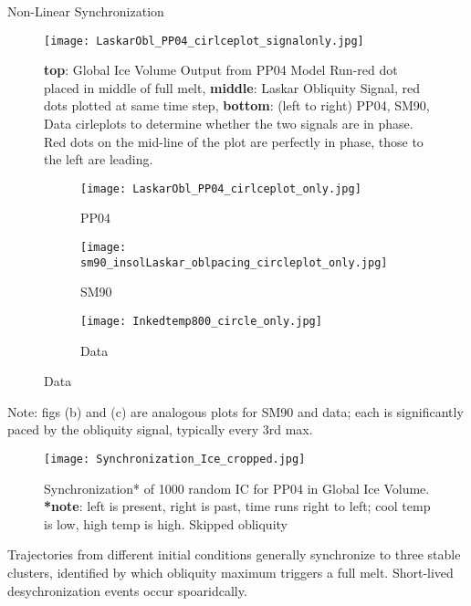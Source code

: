 \documentclass[final]{beamer}
\newlength{\onecolwid}
\newlength{\twocolwid}
\begin{document}
\begin{frame}[t]
\begin{columns}[t]
\begin{column}{\twocolwid}
\begin{columns}[t,totalwidth=\twocolwid]
\begin{column}{\onecolwid}
\begin{block}{Non-Linear Synchronization}
       \begin{figure}
       \centering
      	\texttt{[image: LaskarObl\_PP04\_cirlceplot\_signalonly.jpg]}
      	\caption{\textbf{top}: Global Ice Volume Output from PP04 Model Run-red dot placed in middle of full melt, \textbf{middle}: Laskar Obliquity Signal, red dots plotted at same time step, \textbf{bottom}: (left to right) PP04, SM90, Data cirleplots to determine whether the two signals are in phase. Red dots on the mid-line of the plot are perfectly in phase, those to the left are leading.}
       \end{figure}
       \begin{figure}
       \centering
      	\begin{subfigure}{.33\textwidth}
      	\centering
      	\texttt{[image: LaskarObl\_PP04\_cirlceplot\_only.jpg]}
      	\caption{PP04}
      	\end{subfigure}%
      	\begin{subfigure}{.33\textwidth}
      	\centering
      	\texttt{[image: sm90\_insolLaskar\_oblpacing\_circleplot\_only.jpg]}
      	\caption{SM90}
      	\end{subfigure}%
      	\begin{subfigure}{.33\textwidth}
      	\centering
      	\texttt{[image: Inkedtemp800\_circle\_only.jpg]}
      	\caption{Data}
      	\end{subfigure}%
       \end{figure}
      	Note: figs (b) and (c) are analogous plots for SM90 and data; each is significantly paced by the obliquity signal, typically every 3rd max.
       \begin{figure}
        		\texttt{[image: Synchronization\_Ice\_cropped.jpg]}
        		\caption{Synchronization* of 1000 random IC for PP04 in Global Ice Volume. \textbf{*note}: left is present, right is past, time runs right to left; cool temp is low, high temp is high. Skipped obliquity}
       \end{figure}
       Trajectories from different initial conditions generally synchronize to three stable clusters, identified by which obliquity maximum triggers a full melt. Short-lived desychronization events occur spoaridcally.
       

\end{block}
\end{column}
\end{columns}
\end{column}
\end{columns}
\end{frame}
\end{document}
